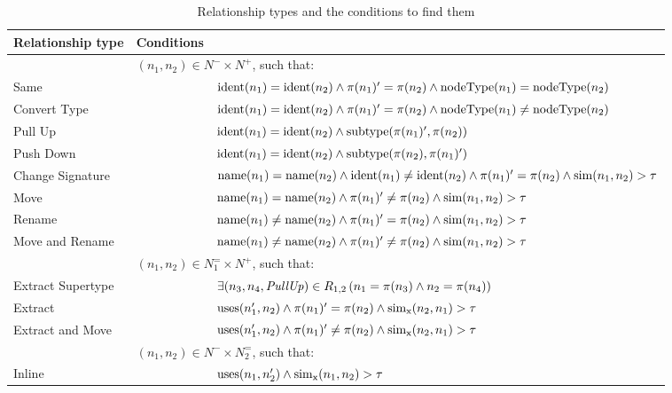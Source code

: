 \begin{table}[htbp]
\renewcommand{\arraystretch}{1.3}
\caption{Relationship types and the conditions to find them}
\label{TabRelationshipTypes}
\centering

\begin{tabular}{@{}lll@{}}
\toprule
Relationship type & Conditions \\
\midrule
& \multicolumn{2}{l}{$(n_1, n_2) \in N^- \times N^+$, such that:}\\
Same & & $\operatorname{ident}(n_1) = \operatorname{ident}(n_2) \land \operatorname{\pi}(n_1)' = \operatorname{\pi}(n_2) \land \operatorname{nodeType}(n_1) = \operatorname{nodeType}(n_2)$ \\
Convert Type & & $\operatorname{ident}(n_1) = \operatorname{ident}(n_2) \land \operatorname{\pi}(n_1)' = \operatorname{\pi}(n_2) \land \operatorname{nodeType}(n_1) \neq \operatorname{nodeType}(n_2)$ \\
Pull Up & & $\operatorname{ident}(n_1) = \operatorname{ident}(n_2) \land \operatorname{subtype}(\operatorname{\pi}(n_1)', \operatorname{\pi}(n_2))$ \\
Push Down & & $\operatorname{ident}(n_1) = \operatorname{ident}(n_2) \land \operatorname{subtype}(\operatorname{\pi}(n_2), \operatorname{\pi}(n_1)')$ \\
Change Signature & & $\operatorname{name}(n_1) = \operatorname{name}(n_2) \land \operatorname{ident}(n_1) \neq \operatorname{ident}(n_2) \land \operatorname{\pi}(n_1)' = \operatorname{\pi}(n_2) \land \operatorname{sim}(n_1, n_2) > \tau$ \\
Move & & $\operatorname{name}(n_1) = \operatorname{name}(n_2) \land \operatorname{\pi}(n_1)' \neq \operatorname{\pi}(n_2) \land \operatorname{sim}(n_1, n_2) > \tau$ \\
Rename & & $\operatorname{name}(n_1) \neq \operatorname{name}(n_2) \land \operatorname{\pi}(n_1)' = \operatorname{\pi}(n_2) \land \operatorname{sim}(n_1, n_2) > \tau$ \\
Move and Rename & & $\operatorname{name}(n_1) \neq \operatorname{name}(n_2) \land \operatorname{\pi}(n_1)' \neq \operatorname{\pi}(n_2) \land \operatorname{sim}(n_1, n_2) > \tau$ \\
\addlinespace
& \multicolumn{2}{l}{$(n_1, n_2) \in N_1^= \times N^+$, such that:}\\
Extract Supertype & & $\exists (n_3, n_4, \mathit{PullUp}) \in R_{1,2}\, (n_1 = \operatorname{\pi}(n_3) \land n_2 = \operatorname{\pi}(n_4))$ \\
Extract & & $\operatorname{uses}(n_1', n_2) \land \operatorname{\pi}(n_1)' = \operatorname{\pi}(n_2) \land \operatorname{sim_{x}}(n_2, n_1) > \tau$ \\
Extract and Move & & $\operatorname{uses}(n_1', n_2) \land \operatorname{\pi}(n_1)' \neq \operatorname{\pi}(n_2) \land \operatorname{sim_{x}}(n_2, n_1) > \tau$ \\
\addlinespace
& \multicolumn{2}{l}{$(n_1, n_2) \in N^- \times N_2^=$, such that:}\\
Inline & & $\operatorname{uses}(n_1, n_2') \land \operatorname{sim_{x}}(n_1, n_2) > \tau$ \\
\bottomrule
\end{tabular}


\end{table}
